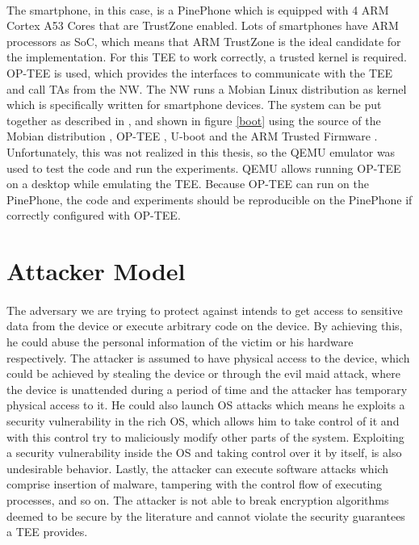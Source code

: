\paragraph*{}
The smartphone, in this case, is a PinePhone which is equipped with 4 ARM Cortex A53 Cores that are TrustZone enabled. Lots of smartphones have ARM processors as SoC, which means that ARM TrustZone is the ideal candidate for the implementation. For this TEE to work correctly, a trusted kernel is required. OP-TEE is used, which provides the interfaces to communicate with the TEE and call TAs from the NW. The NW runs a Mobian Linux distribution as kernel which is specifically written for smartphone devices. The system can be put together as described in \cite{blog}, and shown in figure \ref{boot} using the source of the Mobian distribution \cite{mobian}, OP-TEE \cite{OPTEEgit}, U-boot \cite{u-boot} and the ARM Trusted Firmware \cite{ARMfirmware}. Unfortunately, this was not realized in this thesis, so the QEMU emulator \cite{QEMU} was used to test the code and run the experiments. QEMU allows running OP-TEE on a desktop while emulating the TEE. Because OP-TEE can run on the PinePhone, the code and experiments should be reproducible on the PinePhone if correctly configured with OP-TEE.

\section{Attacker Model}

\paragraph*{}
The adversary we are trying to protect against intends to get access to sensitive data from the device or execute arbitrary code on the device. By achieving this, he could abuse the personal information of the victim or his hardware respectively. The attacker is assumed to have physical access to the device, which could be achieved by stealing the device or through the evil maid attack, where the device is unattended during a period of time and the attacker has temporary physical access to it. He could also launch OS attacks which means he exploits a security vulnerability in the rich OS, which allows him to take control of it and with this control try to maliciously modify other parts of the system. Exploiting a security vulnerability inside the OS and taking control over it by itself, is also undesirable behavior. Lastly, the attacker can execute software attacks which comprise insertion of malware, tampering with the control flow of executing processes, and so on. The attacker is not able to break encryption algorithms deemed to be secure by the literature and cannot violate the security guarantees a TEE provides.

